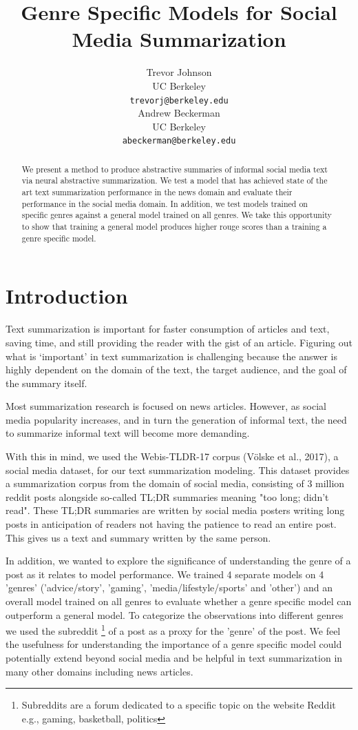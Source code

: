\documentclass[11pt,a4paper, twocolumn]{article}
\title{Genre Specific Models for Social Media Summarization}
\author{Trevor Johnson \\
  UC Berkeley  \\
  \texttt{trevorj@berkeley.edu} \\\And
  Andrew Beckerman \\
  UC Berkeley \\
  \texttt{abeckerman@berkeley.edu} \\}
\date{}
\begin{document}
\maketitle
\begin{abstract}

We present a method to produce abstractive summaries of informal social media text via neural abstractive summarization. We test a model that has achieved state of the art text summarization performance in the news domain and evaluate their performance in the social media domain.
In addition, we test models trained on specific genres against a general model trained on all genres. We take this opportunity to show that training a general model produces higher rouge scores than a training a genre specific model.

\end{abstract}

\section{Introduction}

Text summarization is important for faster consumption of articles and text, saving time, and still providing the reader with the gist of an article. Figuring out what is ‘important’ in text summarization is challenging because the answer is highly dependent on the domain of the text, the target audience, and the goal of the summary itself.

Most summarization research is focused on news articles. However, as social media popularity increases, and in turn the generation of informal text, the need to summarize informal text will become more demanding.

With this in mind, we used the Webis-TLDR-17 corpus (Völske et al., 2017), a social media dataset, for our text summarization modeling. This dataset provides a summarization corpus from the domain of social media, consisting of 3 million reddit posts alongside so-called TL;DR summaries meaning "too long; didn't read".  These TL;DR summaries are written by social media posters writing long posts in anticipation of readers not having the patience to read an entire post. This gives us a text and summary written by the same person.

In addition, we wanted to explore the significance of understanding the genre of a post as it relates to model performance. We trained 4 separate models on 4 'genres' ('advice/story', 'gaming', 'media/lifestyle/sports' and 'other') and an overall model trained on all genres to evaluate whether a genre specific model can outperform a general model. To categorize the observations into different genres we used the subreddit \footnote{Subreddits are a forum dedicated to a specific topic on the website Reddit e.g., gaming, basketball, politics} of a post as a proxy for the 'genre' of the post. We feel the usefulness for understanding the importance of a genre specific model could potentially extend beyond social media and be helpful in text summarization in many other domains including news articles.
\end{document}
